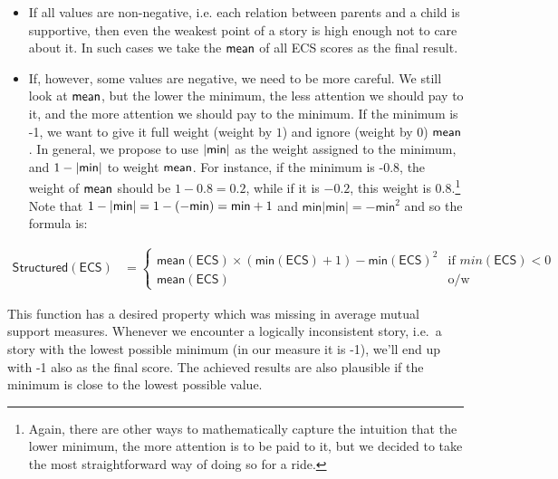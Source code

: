 \documentclass[10pt,]{scrartcl}
\newcommand{\s}[1]{\mbox{\textsf{#1}}}
\begin{document}
\begin{itemize}
\item  If all values are non-negative, i.e. each relation between parents and a child is supportive, then even the weakest point of a story is high enough not to care about it. In such cases we take  the  $\s{mean}$ of all \textsf{ECS} scores as the final result.

\item If, however, some values are negative, we need to be more careful. We still look at  $\s{mean}$, but  the lower the minimum, the less attention we should pay to it, and the more attention we should pay to the minimum. If the minimum is -1, we want to give it full weight (weight by $1$) and ignore (weight by 0) $\s{mean}$. In general, we propose to use $\vert \s{min}\vert$  as the weight assigned to the minimum, and  $1-\vert \s{min}\vert$  to weight $\s{mean}$.  For instance, if the minimum is -0.8, the weight of  $\s{mean}$ should be $1-0.8 = 0.2$, while if it is $-0.2$, this weight is $0.8$.\footnote{Again, there are other ways to mathematically capture the intuition that the lower minimum, the more attention is to be paid to it, but we decided to take the most straightforward way of doing so for a ride.}  Note that  $ 1-\vert \s{min}\vert = 1 - (- \s{min}) = \s{min}+1$ and  $\mathsf{min}\vert\mathsf{min}\vert = -\mathsf{min}^2$ and so the  formula is:
\end{itemize}

\footnotesize

\begin{align*}
\mathsf{Structured}(\mathsf{ECS}) & = \begin{cases}
\mathsf{mean}(\mathsf{ECS})  \times \left(\textsf{min}(\mathsf{ECS})+1 \right) - \textsf{min}(\mathsf{ECS})^2   & \text{if } min(\mathsf{ECS})<0 \\\mathsf{mean}(\mathsf{ECS}) & \text{o/w}
\end{cases}
\end{align*}

\normalsize





This function has a desired property which was missing in average mutual support measures. Whenever we encounter a logically inconsistent
story, i.e.~a story with the lowest possible minimum (in our measure it
is -1), we'll end up with -1 also as the final score. The achieved
results are also plausible if the minimum is close to the lowest
possible value.
\end{document}
